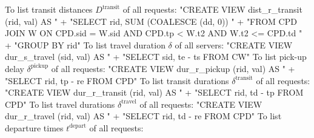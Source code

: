 \nwendcode{}\nwdocspar
To list transit distances $D^\textrm{transit}$ of all requests:
\nwenddocs{}\endmoddef{}
"CREATE VIEW dist_r_transit (rid, val) AS "
  + "SELECT rid, SUM (COALESCE (dd, 0)) "
  + "FROM CPD JOIN W ON CPD.sid = W.sid AND CPD.tp < W.t2 AND W.t2 <= CPD.td "
  + "GROUP BY rid"
\nwendcode{}\nwdocspar
To list travel duration $\delta$ of all servers:
\nwenddocs{}\endmoddef{}
"CREATE VIEW dur_s_travel (sid, val) AS "
  + "SELECT sid, te - ts FROM CW"
\nwendcode{}\nwdocspar
To list pick-up delay $\delta^\textrm{pickup}$ of all requests:
\nwenddocs{}\endmoddef{}
"CREATE VIEW dur_r_pickup (rid, val) AS "
  + "SELECT rid, tp - re FROM CPD"
\nwendcode{}\nwdocspar
To list transit durations $\delta^\textrm{transit}$ of all requests:
\nwenddocs{}\endmoddef{}
"CREATE VIEW dur_r_transit (rid, val) AS "
  + "SELECT rid, td - tp FROM CPD"
\nwendcode{}\nwdocspar
To list travel durations $\delta^\textrm{travel}$ of all requests:
\nwenddocs{}\endmoddef{}
"CREATE VIEW dur_r_travel (rid, val) AS "
  + "SELECT rid, td - re FROM CPD"
\nwendcode{}\nwdocspar
To list departure times $t^\textrm{depart}$ of all requests:
